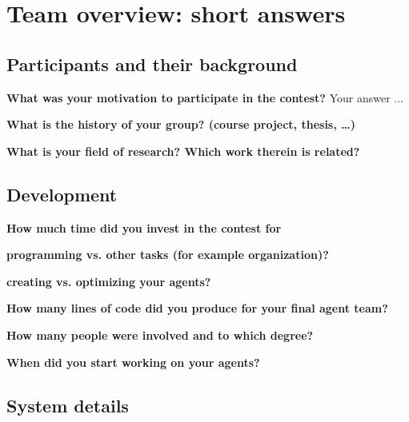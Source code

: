 \documentclass{llncs}
\begin{document}
\section{Team overview: short answers}

\subsection{Participants and their background}

\begin{description}
  \item \textbf{What was your motivation to participate in the contest?}
    Your answer ...
  \item \textbf{What is the history of your group? (course project, thesis, \ldots)}
  \item \textbf{What is your field of research? Which work therein is related?}
\end{description}

\subsection{Development}

\begin{description}
  \item \textbf{How much time did you invest in the contest for}
    \begin{description}
      \item \textbf{programming vs. other tasks (for example organization)?}
      \item \textbf{creating vs. optimizing your agents?}
    \end{description}
  \item \textbf{How many lines of code did you produce for your final agent team?}
  \item \textbf{How many people were involved and to which degree?}
  \item \textbf{When did you start working on your agents?}
\end{description}

\subsection{System details}
\end{document}
